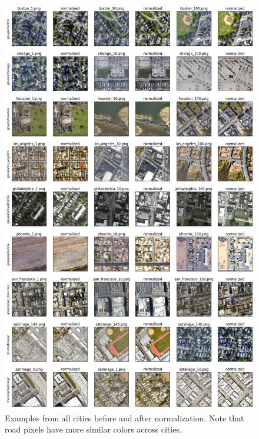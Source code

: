 \documentclass[10pt,conference,compsocconf]{IEEEtran}
\begin{document}
\begin{figure}[ht]
    \centering
    \includegraphics[height=0.9\textheight]{pictures/normalized_viz.png}
    \captionsetup{width=0.9\textwidth}
    \caption{Examples from all cities before and after normalization. Note that road pixels have more similar colors across cities.}
    \label{fig:normalized_viz}
\end{figure}

\clearpage

\end{document}
